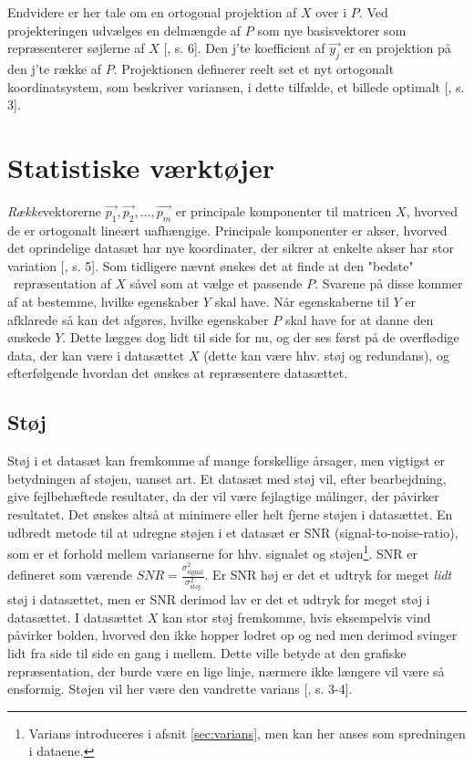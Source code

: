 Endvidere er her tale om en ortogonal projektion af $X$ over i $P$. 
Ved projekteringen udvælges en delmængde af $P$ som nye basisvektorer som repræsenterer søjlerne af $X$ [\citet{PCA_people}, s. 6]. Den j'te koefficient af $\vec{y_j}$ er en projektion på den j'te række af $P$. Projektionen definerer reelt set et nyt ortogonalt koordinatsystem, som beskriver variansen, i dette tilfælde, et billede optimalt [\citet{PCA_slens}, s. 3].


\section{Statistiske værktøjer} \label{sec:statistiske tools}
\emph{Række}vektorerne ${\vec{p_{1}}},{\vec{p_{2}}},\ldots,{\vec{p_{m}}}$ er principale komponenter til matricen $X$, hvorved de er ortogonalt lineært uafhængige. Principale komponenter er akser, hvorved det oprindelige datasæt har nye koordinater, der sikrer at enkelte akser har stor variation [\citet{PCA_slens}, s. 5]. Som tidligere nævnt ønskes det at finde at den "bedste" \ repræsentation af $X$ såvel som at vælge et passende $P$. Svarene på disse kommer af at bestemme, hvilke egenskaber $Y$ skal have. Når egenskaberne til $Y$ er afklarede så kan det afgøres, hvilke egenskaber $P$ skal have for at danne den ønskede $Y$. Dette lægges dog lidt til side for nu, og der ses først på de overflødige data, der kan være i datasættet $X$ (dette kan være hhv. støj og redundans), og efterfølgende hvordan det ønskes at repræsentere datasættet.

\subsection{Støj} \label{sec:stoj}
Støj i et datasæt kan fremkomme af mange forskellige årsager, men vigtigst er betydningen af støjen, uanset art. Et datasæt med støj vil, efter bearbejdning, give fejlbehæftede resultater, da der vil være fejlagtige målinger, der påvirker resultatet. Det ønskes altså at minimere eller helt fjerne støjen i datasættet. En udbredt metode til at udregne støjen i et datasæt er SNR (signal-to-noise-ratio), som er et forhold mellem varianserne for hhv. signalet og støjen\footnote{Varians introduceres i afsnit \ref{sec:varians}, men kan her anses som spredningen i dataene.}. SNR er defineret som værende $SNR = \frac{\sigma^2_{\text{signal}}}{\sigma^{2}_{\text{støj}}}$. Er SNR høj er det et udtryk for meget \emph{lidt} støj i datasættet, men er SNR derimod lav er det et udtryk for meget støj i datasættet. I datasættet $X$ kan stor støj fremkomme, hvis eksempelvis vind påvirker bolden, hvorved den ikke hopper lodret op og ned men derimod svinger lidt fra side til side en gang i mellem. Dette ville betyde at den grafiske repræsentation, der burde være en lige linje, nærmere ikke længere vil være så ensformig. Støjen vil her være den vandrette varians [\citet{PCA_slens}, s. 3-4].

